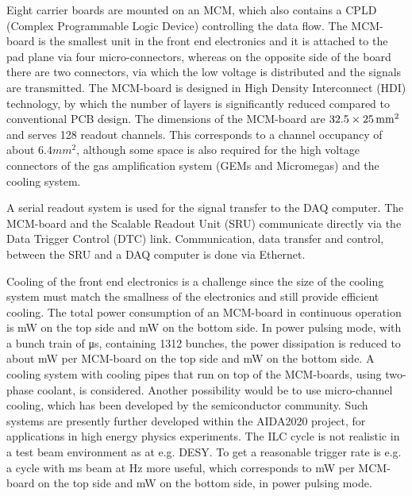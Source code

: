 \noindent Eight carrier boards are mounted on an MCM, which also contains a CPLD (Complex Programmable Logic Device) controlling the data flow. The MCM-board is the smallest unit in the front end electronics and it is attached to the pad plane via four micro-connectors, whereas on the opposite side of the board there are two connectors, via which the low voltage is distributed and the signals are transmitted. The MCM-board is designed in High Density Interconnect (HDI) technology, by which the number of layers is significantly reduced compared to conventional PCB design. The dimensions of the MCM-board are $32.5 \times \unit[25]{mm^2}$ and serves 128 readout channels. This corresponds to a channel occupancy of about $\unit{6.4}{mm^{2}}$, although some space is also required for the high voltage connectors of the gas amplification system (GEMs and Micromegas) and the cooling system.

\noindent A serial readout system is used for the signal transfer to the DAQ computer. The MCM-board and the Scalable Readout Unit (SRU) communicate directly via the Data Trigger Control (DTC) link. Communication, data transfer and control, between the SRU and a DAQ computer is done via Ethernet.

\noindent Cooling of the front end electronics is a challenge since the size of the cooling system must match the smallness of the electronics and still provide efficient cooling. The total power consumption of an MCM-board in continuous operation
is \unit[3203]{mW} on the top side and \unit[3028]{mW} on the bottom side. In power pulsing mode, with a bunch train of \unit[725]{\micro s}, containing 1312 bunches, the power dissipation is reduced to about \unit[223]{mW} per MCM-board on the top side and \unit[48]{mW} on the bottom side. A cooling system with cooling pipes that run on top of the MCM-boards, using two-phase  coolant, is considered. Another possibility would be to use micro-channel cooling, which has been developed by the semiconductor community. Such systems are presently further developed within the AIDA2020 project, for applications in high energy physics experiments. The ILC cycle is not realistic in a test beam environment as at e.g. DESY. To get a reasonable trigger rate is e.g. a cycle with \unit[5]{ms} beam at \unit[10]{Hz} more useful, which corresponds to \unit[343]{mW} per MCM-board on the top side and \unit[168]{mW} on the bottom side, in power pulsing mode.

